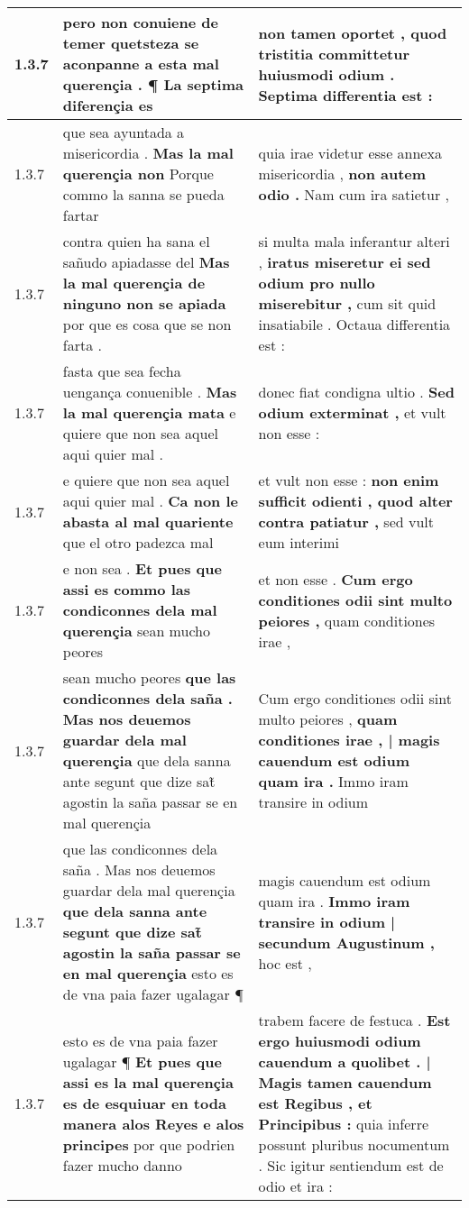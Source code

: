 \begin{tabular}{|p{1cm}|p{6.5cm}|p{6.5cm}|}
1.3.7 & pero non conuiene de temer \textbf{ quetsteza se aconpanne a esta mal querençia . } ¶ La septima diferençia es & non tamen oportet , \textbf{ quod tristitia committetur huiusmodi odium . } Septima differentia est : \\\hline
1.3.7 & que sea ayuntada a misericordia . \textbf{ Mas la mal querençia non } Porque commo la sanna se pueda fartar & quia irae videtur esse annexa misericordia , \textbf{ non autem odio . } Nam cum ira satietur , \\\hline
1.3.7 & contra quien ha sana el sañudo apiadasse del \textbf{ Mas la mal querençia de ninguno non se apiada } por que es cosa que se non farta . & si multa mala inferantur alteri , \textbf{ iratus miseretur ei sed odium pro nullo miserebitur , } cum sit quid insatiabile . Octaua differentia est : \\\hline
1.3.7 & fasta que sea fecha uengança conuenible . \textbf{ Mas la mal querençia mata } e quiere que non sea aquel aqui quier mal . & donec fiat condigna ultio . \textbf{ Sed odium exterminat , } et vult non esse : \\\hline
1.3.7 & e quiere que non sea aquel aqui quier mal . \textbf{ Ca non le abasta al mal quariente } que el otro padezca mal & et vult non esse : \textbf{ non enim sufficit odienti , quod alter contra patiatur , } sed vult eum interimi \\\hline
1.3.7 & e non sea . \textbf{ Et pues que assi es commo las condiconnes dela mal querençia } sean mucho peores & et non esse . \textbf{ Cum ergo conditiones odii sint multo peiores , } quam conditiones irae , \\\hline
1.3.7 & sean mucho peores \textbf{ que las condiconnes dela saña . Mas nos deuemos guardar dela mal querençia } que dela sanna ante segunt que dize sat̃ agostin la saña passar se en mal querençia & Cum ergo conditiones odii sint multo peiores , \textbf{ quam conditiones irae , | magis cauendum est odium quam ira . } Immo iram transire in odium \\\hline
1.3.7 & que las condiconnes dela saña . Mas nos deuemos guardar dela mal querençia \textbf{ que dela sanna ante segunt que dize sat̃ agostin la saña passar se en mal querençia } esto es de vna paia fazer ugalagar ¶ & magis cauendum est odium quam ira . \textbf{ Immo iram transire in odium | secundum Augustinum , } hoc est , \\\hline
1.3.7 & esto es de vna paia fazer ugalagar ¶ \textbf{ Et pues que assi es la mal querençia es de esquiuar en toda manera alos Reyes e alos principes } por que podrien fazer mucho danno & trabem facere de festuca . \textbf{ Est ergo huiusmodi odium cauendum a quolibet . | Magis tamen cauendum est Regibus , et Principibus : } quia inferre possunt pluribus nocumentum . Sic igitur sentiendum est de odio et ira : \\\hline

\end{tabular}
